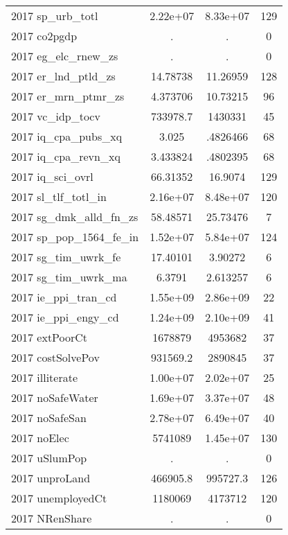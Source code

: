 {\begin{tabular}{l*{1}{ccc}}
2017 sp\_urb\_totl    &    2.22e+07&    8.33e+07&         129\\
2017 co2pgdp        &           .&           .&           0\\
2017 eg\_elc\_rnew\_zs &           .&           .&           0\\
2017 er\_lnd\_ptld\_zs &    14.78738&    11.26959&         128\\
2017 er\_mrn\_ptmr\_zs &    4.373706&    10.73215&          96\\
2017 vc\_idp\_tocv    &    733978.7&     1430331&          45\\
2017 iq\_cpa\_pubs\_xq &       3.025&    .4826466&          68\\
2017 iq\_cpa\_revn\_xq &    3.433824&    .4802395&          68\\
2017 iq\_sci\_ovrl    &    66.31352&     16.9074&         129\\
2017 sl\_tlf\_totl\_in &    2.16e+07&    8.48e+07&         120\\
2017 sg\_dmk\_alld\_fn\_zs&    58.48571&    25.73476&           7\\
2017 sp\_pop\_1564\_fe\_in&    1.52e+07&    5.84e+07&         124\\
2017 sg\_tim\_uwrk\_fe &    17.40101&     3.90272&           6\\
2017 sg\_tim\_uwrk\_ma &      6.3791&    2.613257&           6\\
2017 ie\_ppi\_tran\_cd &    1.55e+09&    2.86e+09&          22\\
2017 ie\_ppi\_engy\_cd &    1.24e+09&    2.10e+09&          41\\
2017 extPoorCt      &     1678879&     4953682&          37\\
2017 costSolvePov   &    931569.2&     2890845&          37\\
2017 illiterate     &    1.00e+07&    2.02e+07&          25\\
2017 noSafeWater    &    1.69e+07&    3.37e+07&          48\\
2017 noSafeSan      &    2.78e+07&    6.49e+07&          40\\
2017 noElec         &     5741089&    1.45e+07&         130\\
2017 uSlumPop       &           .&           .&           0\\
2017 unproLand      &    466905.8&    995727.3&         126\\
2017 unemployedCt   &     1180069&     4173712&         120\\
2017 NRenShare      &           .&           .&           0\\

\end{tabular}}

